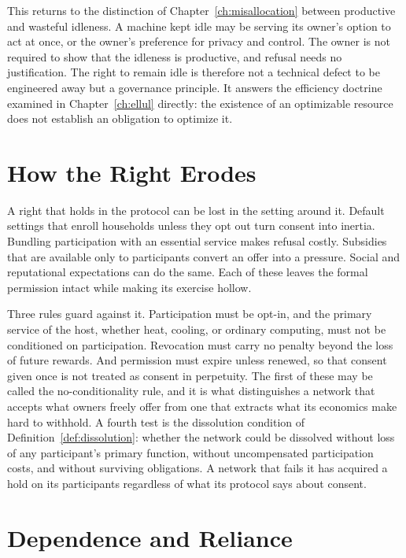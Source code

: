This returns to the distinction of Chapter~\ref{ch:misallocation} between productive and wasteful idleness. A machine kept idle may be serving its owner's option to act at once, or the owner's preference for privacy and control. The owner is not required to show that the idleness is productive, and refusal needs no justification. The right to remain idle is therefore not a technical defect to be engineered away but a governance principle. It answers the efficiency doctrine examined in Chapter~\ref{ch:ellul} directly: the existence of an optimizable resource does not establish an obligation to optimize it.

\section{How the Right Erodes}

A right that holds in the protocol can be lost in the setting around it. Default settings that enroll households unless they opt out turn consent into inertia. Bundling participation with an essential service makes refusal costly. Subsidies that are available only to participants convert an offer into a pressure. Social and reputational expectations can do the same. Each of these leaves the formal permission intact while making its exercise hollow.

Three rules guard against it. Participation must be opt-in, and the primary service of the host, whether heat, cooling, or ordinary computing, must not be conditioned on participation. Revocation must carry no penalty beyond the loss of future rewards. And permission must expire unless renewed, so that consent given once is not treated as consent in perpetuity. The first of these may be called the no-conditionality rule, and it is what distinguishes a network that accepts what owners freely offer from one that extracts what its economics make hard to withhold. A fourth test is the dissolution condition of Definition~\ref{def:dissolution}: whether the network could be dissolved without loss of any participant's primary function, without uncompensated participation costs, and without surviving obligations. A network that fails it has acquired a hold on its participants regardless of what its protocol says about consent.

\section{Dependence and Reliance}

